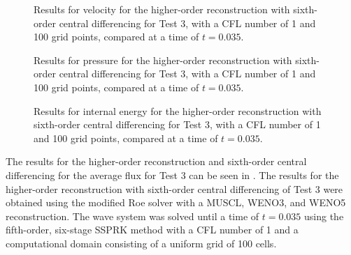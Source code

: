 \begin{figure}
	\caption[Results for velocity for the higher-order reconstruction with sixth-order central differencing for Test 3, with a CFL number of 1 and 100 grid points, compared at a time of $t=0.035$.]{Results for velocity for the higher-order reconstruction with sixth-order central differencing for Test 3, with a CFL number of 1 and 100 grid points, compared at a time of $t=0.035$.}
	\label{fig:Test4HORCD6velocity}
\end{figure}

\begin{figure}
	\caption[Results for pressure for the higher-order reconstruction with sixth-order central differencing for Test 3, with a CFL number of 1 and 100 grid points, compared at a time of $t=0.035$.]{Results for pressure for the higher-order reconstruction with sixth-order central differencing for Test 3, with a CFL number of 1 and 100 grid points, compared at a time of $t=0.035$.}
	\label{fig:Test4HORCD6pressure}
\end{figure}

\begin{figure}
	\caption[Results for internal energy for the higher-order reconstruction with sixth-order central differencing for Test 3, with a CFL number of 1 and 100 grid points, compared at a time of $t=0.035$.]{Results for internal energy for the higher-order reconstruction with sixth-order central differencing for Test 3, with a CFL number of 1 and 100 grid points, compared at a time of $t=0.035$.}
	\label{fig:Test4HORCD6energy}
\end{figure}

The results for the higher-order reconstruction and sixth-order central differencing for the average flux for Test 3 can be seen in . The results for the higher-order reconstruction with sixth-order central differencing of Test 3 were obtained using the modified Roe solver with a MUSCL, WENO3, and WENO5 reconstruction. The wave system was solved until a time of $t=0.035$ using the fifth-order, six-stage SSPRK method with a CFL number of 1 and a computational domain consisting of a uniform grid of 100 cells.

